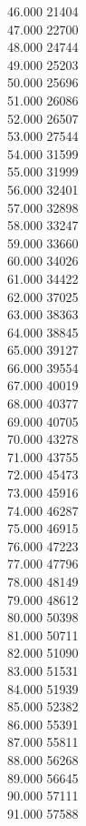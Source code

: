 { 46.000	21404 \\
 47.000	22700 \\
 48.000	24744 \\
 49.000	25203 \\
 50.000	25696 \\
 51.000	26086 \\
 52.000	26507 \\
 53.000	27544 \\
 54.000	31599 \\
 55.000	31999 \\
 56.000	32401 \\
 57.000	32898 \\
 58.000	33247 \\
 59.000	33660 \\
 60.000	34026 \\
 61.000	34422 \\
 62.000	37025 \\
 63.000	38363 \\
 64.000	38845 \\
 65.000	39127 \\
 66.000	39554 \\
 67.000	40019 \\
 68.000	40377 \\
 69.000	40705 \\
 70.000	43278 \\
 71.000	43755 \\
 72.000	45473 \\
 73.000	45916 \\
 74.000	46287 \\
 75.000	46915 \\
 76.000	47223 \\
 77.000	47796 \\
 78.000	48149 \\
 79.000	48612 \\
 80.000	50398 \\
 81.000	50711 \\
 82.000	51090 \\
 83.000	51531 \\
 84.000	51939 \\
 85.000	52382 \\
 86.000	55391 \\
 87.000	55811 \\
 88.000	56268 \\
 89.000	56645 \\
 90.000	57111 \\
 91.000	57588 \\
}

